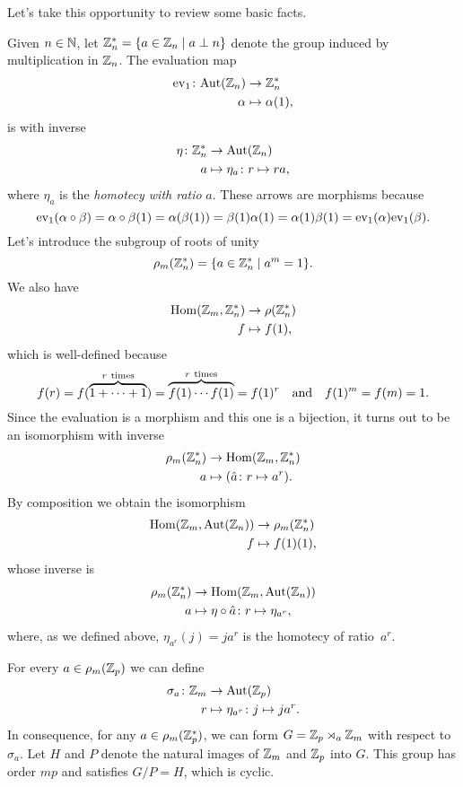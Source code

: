 \begin{solution} Let's take this opportunity to review some basic facts.

Given $n\in\mathbb{N}$, let $\mathbb{Z}_n^*=\{a\in\mathbb{Z}_n\mid a\perp n\}$ denote the group induced by multiplication in $\mathbb{Z}_n$. The evaluation map
\begin{align*}
    {\rm ev}_{1}\colon{\rm Aut}(\mathbb{Z}_n)&\to\mathbb{Z}_n^*\\
    \alpha&\mapsto\alpha(1),
\end{align*}
is with inverse
\begin{align*}
    \eta\colon\mathbb{Z}_n^*&\to{\rm Aut}(\mathbb{Z}_n)\\
    a&\mapsto \eta_a\colon r\mapsto ra,
\end{align*}
where $\eta_a$ is the \textsl{homotecy with ratio} $a$.
These arrows are morphisms because
$$
    {\rm ev}_{1}(\alpha\circ\beta)
        = \alpha\circ\beta(1)
        =\alpha(\beta(1))
        =\beta(1)\alpha(1)
        = \alpha(1)\beta(1)
        = {\rm ev}_{1}(\alpha){\rm ev}_{1}(\beta).
$$
Let's introduce the subgroup of roots of unity
$$
    \rho_m(\mathbb{Z}_n^*)=\{a\in\mathbb{Z}_n^*\mid a^m=1\}.
$$
We also have
\begin{align*}
    {\rm Hom}(\mathbb{Z}_m,\mathbb{Z}_n^*)&\to\rho(\mathbb{Z}_n^*)\\
    f&\mapsto f(1),
\end{align*}
which is well-defined because
$$
    f(r) = f(\overbrace{1+\cdots+1}^{r\rm\ times})
        = \overbrace{f(1)\cdots f(1)}^{r\rm\ times}
        = f(1)^r\quad\textrm{and}\quad f(1)^m=f(m)=1.
$$
Since the evaluation is a morphism and this one is a bijection, it turns out to be an isomorphism with inverse
\begin{align*}
    \rho_m(\mathbb{Z}_n^*)&\to{\rm Hom}(\mathbb{Z}_m,\mathbb{Z}_n^*)\\
    a&\mapsto (\hat a\colon r\mapsto a^r).
\end{align*}
By composition we obtain the isomorphism
\begin{align*}
    {\rm Hom}(\mathbb{Z}_m,{\rm Aut}(\mathbb{Z}_n))&\to\rho_m(\mathbb{Z}_n^*)\\
    f&\mapsto f(1)(1),
\end{align*}
whose inverse is
\begin{align*}
    \rho_m(\mathbb{Z}_n^*)&\to{\rm Hom}(\mathbb{Z}_m,{\rm Aut}(\mathbb{Z}_n))\\
    a&\mapsto \eta\circ\hat a\colon r\mapsto\eta_{a^r},
\end{align*}
where, as we defined above, $\eta_{a^r}(j)=ja^r$ is the homotecy of ratio~$a^r$.

For every $a\in\rho_m(\mathbb{Z}_p)$ we can define
\begin{align*}
    \sigma_a\colon\mathbb{Z}_m&\to{\rm Aut}(\mathbb{Z}_p)\\
        r&\mapsto\eta_{a^r}\colon j\mapsto ja^r.
\end{align*}
In consequence, for any $a\in\rho_m(\mathbb{Z}_p^*)$, we can form $G=\mathbb{Z}_p\rtimes_a\mathbb{Z}_m$ with respect to $\sigma_a$. Let $H$ and $P$ denote the natural images of $\mathbb{Z}_m$ and $\mathbb{Z}_p$ into $G$. This group has order $mp$ and satisfies $G/P=H$, which is cyclic.


\end{solution}
